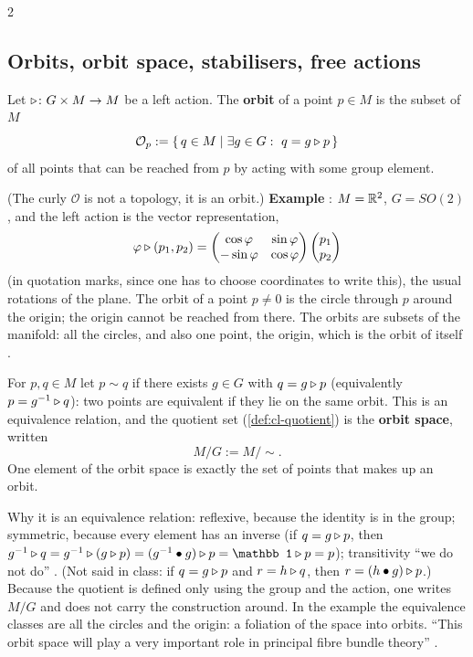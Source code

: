 \begin{paracol}{2}
\subsection{Orbits, orbit space, stabilisers, free actions}\label{sec:pb-orbits}
\begin{definition}\label{def:pb-orbit}
Let $\mathbin{\triangleright}\colon G\times M\to M$ be a left action. The \textbf{orbit} of a point $p\in M$ is the subset of $M$
\[
  \mathcal O_p:=\{\,q\in M\mid\exists g\in G:\ q=g\mathbin{\triangleright} p\,\}
\]
of all points that can be reached from $p$ by acting with some group element.    
\end{definition}
(The curly $\mathcal O$ is not a topology, it is an orbit.) \textbf{Example} : $M=\mathbb{R}^2$, $G=SO(2)$, and the left action is the vector representation,
\[
  \varphi\mathbin{\triangleright}(p_1,p_2)=\begin{pmatrix}\cos\varphi&\sin\varphi\\-\sin\varphi&\cos\varphi\end{pmatrix}\begin{pmatrix}p_1\\p_2\end{pmatrix}
\]
(in quotation marks, since one has to choose coordinates to write this), the usual rotations of the plane. The orbit of a point $p\neq0$ is the circle through $p$ around the origin; the origin cannot be reached from there. The orbits are subsets of the manifold: all the circles, and also one point, the origin, which is the orbit of itself      .

\begin{definition}\label{def:pb-orbitspace}
For $p,q\in M$ let $p\sim q$ if there exists $g\in G$ with $q=g\mathbin{\triangleright} p$ (equivalently $p=g^{-1}\mathbin{\triangleright} q$): two points are equivalent if they lie on the same orbit. This is an equivalence relation, and the quotient set (\cref{def:cl-quotient}) is the \textbf{orbit space}, written
\[
  M/G:=M/\!\sim .
\]
One element of the orbit space is exactly the set of points that makes up an orbit.       
\end{definition}
Why it is an equivalence relation: reflexive, because the identity is in the group; symmetric, because every element has an inverse (if $q=g\mathbin{\triangleright} p$, then $g^{-1}\lact q=g^{-1}\lact(g\lact p)=(g^{-1}\bullet g)\lact p=\mathbb 1\lact p=p$); transitivity ``we do not do''   . (Not said in class: if $q=g\mathbin{\triangleright} p$ and $r=h\mathbin{\triangleright} q$, then $r=(h\bullet g)\mathbin{\triangleright} p$.) Because the quotient is defined only using the group and the action, one writes $M/G$ and does not carry the construction around. In the example the equivalence classes are all the circles and the origin: a foliation of the space into orbits. ``This orbit space will play a very important role in principal fibre bundle theory''   .


\end{paracol}
